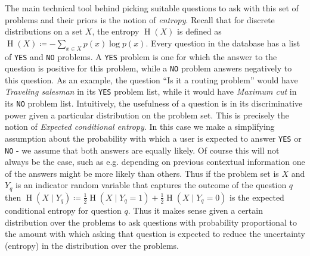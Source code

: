 \documentclass[a4paper,10pt]{article}
\newcommand{\ent}{\operatorname{H}}
\begin{document}
The main technical tool behind picking suitable questions to ask with this set of problems and their
priors is the notion of \emph{entropy}. Recall that for discrete distributions on a set \(X\), the
entropy \(\ent(X)\) is defined as \(\ent(X) \coloneqq -\sum_{x \in X} p(x) \log{p(x)}\). Every question
in the database has a list of \texttt{YES} and \texttt{NO} problems. A \texttt{YES} problem is one
for which the answer to the question is positive for this problem, while a \texttt{NO} problem
answers negatively to this question. As an example, the question ``Is it a routing problem'' would have
\emph{Traveling salesman} in its \texttt{YES} problem list, while it would have \emph{Maximum cut}
in its \texttt{NO} problem list. Intuitively, the usefulness of a question is in its discriminative
power given a particular distribution on the problem set. This is precisely the notion of 
\emph{Expected conditional entropy}. In this case we make a simplifying assumption about the 
probability with which a user is expected to answer \texttt{YES} or \texttt{NO} - we assume
that both answers are equally likely. Of course this will not always be the case, such as e.g.
depending on previous contextual information  one of the 
answers might be more likely than others. Thus if the problem set is \(X\) and 
\(Y_q\) is an indicator random variable that captures the outcome of the question \(q\) then
\(\ent(X \mid Y_q) \coloneqq  \frac{1}{2} \ent(X \mid Y_q = 1) + \frac{1}{2}\ent(X \mid Y_q = 0)\) 
is the expected conditional entropy for question \(q\). Thus it makes sense given a certain distribution
over the problems to ask questions with probability proportional to the amount with which
asking that question is expected to reduce the uncertainty (entropy) in the distribution over the problems. 
\end{document}

